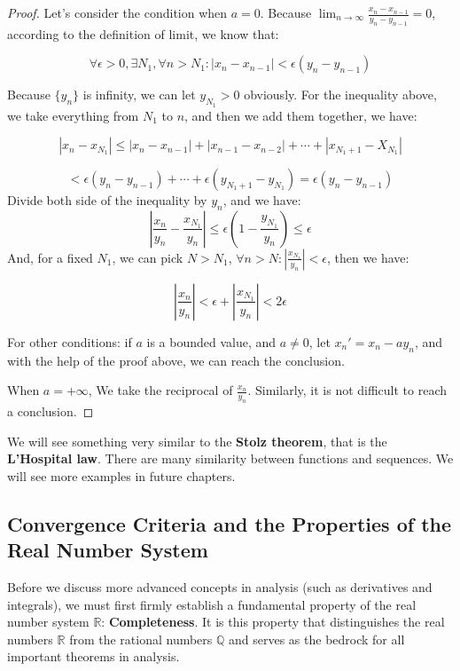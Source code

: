 \begin{proof}
Let's consider the condition when $a=0$.
Because $\lim_{n \to \infty} \frac{x_n -x_{n-1}}{y_n-y_{n-1}}=0$, according to the definition of limit, we know that:

\[
\forall\epsilon > 0, \exists N_1,\forall n> N_1:|x_n-x_{n-1}|<\epsilon(y_n-y_{n-1})
\]

Because $\{y_n\}$ is infinity, we can let $y_{N_1} > 0$ obviously. For the inequality above, we take everything from $N_1$ to $n$, and then we add them together, we have:

\[
|x_n-x_{N_1}|\leq |x_n-x_{n-1}| +|x_{n-1}-x_{n-2}|+\cdots+ |x_{N_1+1}-X_{N_1}|
\]

\[
 < \epsilon (y_n-y_{n-1}) + \cdots + \epsilon (y_{N_1+1}-y_{N_1}) = \epsilon (y_n-y_{n-1})
\]
Divide both side of the inequality by $y_n$, and we have:
\[
|\frac{x_n}{y_n}-\frac{x_{N_1}}{y_n}|\leq \epsilon (1-\frac{y_{N_1}}{y_n}) \leq \epsilon
\]
And, for a fixed $N_1$, we can pick $N>N_1$, $\forall n >N: |\frac{x_{N_1}}{y_n}|<\epsilon$, then we have:

\[
|\frac{x_n}{y_n}|<\epsilon+|\frac{x_{N_1}}{y_n}|<2\epsilon
\]

For other conditions: if $a$ is a bounded value, and $a \neq 0$, let ${x_n}'=x_n-ay_n$, and with the help of the proof above, we can reach the conclusion.

When $a=+\infty$, We take the reciprocal of $\frac{x_n}{y_n}$. Similarly, it is not difficult to reach a conclusion.

\end{proof}

We will see something very similar to the \textbf{Stolz theorem}, that is the \textbf{L'Hospital law}. There are many similarity between functions and sequences. We will see more examples in future chapters.


\subsection{Convergence Criteria and the Properties of the Real Number System}

Before we discuss more advanced concepts in analysis (such as derivatives and integrals), we must first firmly establish a fundamental property of the real number system $\mathbb{R}$: \textbf{Completeness}. It is this property that distinguishes the real numbers $\mathbb{R}$ from the rational numbers $\mathbb{Q}$ and serves as the bedrock for all important theorems in analysis.


